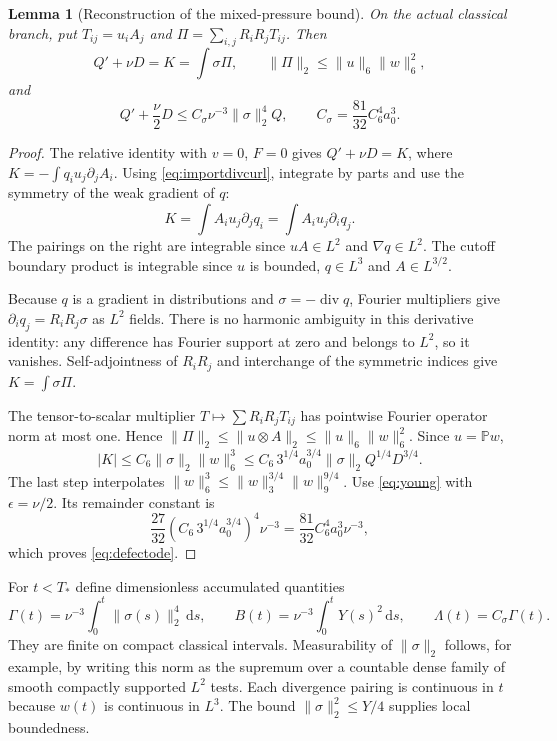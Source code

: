 \documentclass[11pt,a4paper]{article}
\newtheorem{lemma}[theorem]{Lemma}
\theoremstyle{definition}\newtheorem{definition}[theorem]{Definition}
\theoremstyle{remark}\newtheorem{remark}[theorem]{Remark}
\newcommand{\PP}{\mathbb P}
\newcommand{\dd}{\,\mathrm d}
\newcommand{\norm}[1]{\lVert #1\rVert}
\newcommand{\diver}{\operatorname{div}}
\newcommand{\Csg}{C_\sigma}
\numberwithin{equation}{section}
\begin{document}
\begin{lemma}[Reconstruction of the mixed-pressure bound]\label{lem:mixed}
On the actual classical branch, put $T_{ij}=u_iA_j$ and
$\Pi=\sum_{i,j}R_iR_jT_{ij}$. Then
\begin{equation}\label{eq:mixed}
 Q'+\nu D=K=\int\sigma\Pi,\qquad
 \norm\Pi_2\le\norm u_6\norm w_6^2,
\end{equation}
and
\begin{equation}\label{eq:defectode}
 Q'+\frac\nu2D\le\Csg\nu^{-3}\norm\sigma_2^4 Q,
 \qquad \Csg=\frac{81}{32}C_6^4a_0^3.
\end{equation}
\end{lemma}
\begin{proof}
The relative identity with $v=0$, $F=0$ gives $Q'+\nu D=K$, where $K=-\int q_i u_j\partial_jA_i$. Using \eqref{eq:importdivcurl}, integrate by parts and use the symmetry of the weak gradient of $q$:
\[
 K=\int A_i u_j\partial_jq_i=\int A_i u_j\partial_iq_j.
\]
The pairings on the right are integrable since $uA\in L^2$ and $\nabla q\in L^2$. The cutoff boundary product is integrable since $u$ is bounded, $q\in L^3$ and $A\in L^{3/2}$.

Because $q$ is a gradient in distributions and $\sigma=-\diver q$, Fourier multipliers give $\partial_iq_j=R_iR_j\sigma$ as $L^2$ fields. There is no harmonic ambiguity in this derivative identity: any difference has Fourier support at zero and belongs to $L^2$, so it vanishes. Self-adjointness of $R_iR_j$ and interchange of the symmetric indices give $K=\int\sigma\Pi$.

The tensor-to-scalar multiplier $T\mapsto\sum R_iR_jT_{ij}$ has pointwise Fourier operator norm at most one. Hence $\norm\Pi_2\le\norm{u\otimes A}_2\le\norm u_6\norm w_6^2$. Since $u=\PP w$,
\[
 |K|\le C_6\norm\sigma_2\norm w_6^3
 \le C_6\,3^{1/4}a_0^{3/4}\norm\sigma_2Q^{1/4}D^{3/4}.
\]
The last step interpolates $\norm w_6^3\le\norm w_3^{3/4}\norm w_9^{9/4}$. Use \eqref{eq:young} with $\epsilon=\nu/2$. Its remainder constant is
\[
 \frac{27}{32}(C_6\,3^{1/4}a_0^{3/4})^4\nu^{-3}
 =\frac{81}{32}C_6^4a_0^3\nu^{-3},
\]
which proves \eqref{eq:defectode}.
\end{proof}

For $t<T_*$ define dimensionless accumulated quantities
\begin{equation}\label{eq:GB}
 \Gamma(t)=\nu^{-3}\int_0^t\norm{\sigma(s)}_2^4\dd s,
 \qquad B(t)=\nu^{-3}\int_0^tY(s)^2\dd s,
 \qquad\Lambda(t)=\Csg \Gamma(t).
\end{equation}
They are finite on compact classical intervals. Measurability of $\norm\sigma_2$ follows, for example, by writing this norm as the supremum over a countable dense family of smooth compactly supported $L^2$ tests. Each divergence pairing is continuous in $t$ because $w(t)$ is continuous in $L^3$. The bound $\norm\sigma_2^2\le Y/4$ supplies local boundedness.
\end{document}
